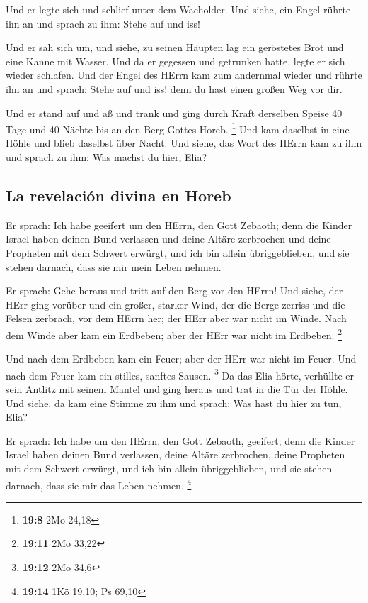  Und er legte sich und schlief unter dem Wacholder. Und
siehe, ein Engel rührte ihn an und sprach zu ihm: Stehe auf und iss!

 Und er sah sich um, und siehe, zu seinen Häupten lag ein
geröstetes Brot und eine Kanne mit Wasser. Und da er gegessen und
getrunken hatte, legte er sich wieder schlafen.  Und der
Engel des HErrn kam zum andernmal wieder und rührte ihn an und sprach:
Stehe auf und iss! denn du hast einen großen Weg vor dir.

 Und er stand auf und aß und trank und ging durch Kraft
derselben Speise 40 Tage und 40 Nächte bis an den Berg Gottes Horeb.
\footnote{\textbf{19:8} 2Mo 24,18}  Und kam daselbst in
eine Höhle und blieb daselbst über Nacht. Und siehe, das Wort des HErrn
kam zu ihm und sprach zu ihm: Was machst du hier, Elia?

\hypertarget{la-revelaciuxf3n-divina-en-horeb}{%
\subsection{La revelación divina en
Horeb}\label{la-revelaciuxf3n-divina-en-horeb}}

 Er sprach: Ich habe geeifert um den HErrn, den Gott
Zebaoth; denn die Kinder Israel haben deinen Bund verlassen und deine
Altäre zerbrochen und deine Propheten mit dem Schwert erwürgt, und ich
bin allein übriggeblieben, und sie stehen darnach, dass sie mir mein
Leben nehmen.

 Er sprach: Gehe heraus und tritt auf den Berg vor den
HErrn! Und siehe, der HErr ging vorüber und ein großer, starker Wind,
der die Berge zerriss und die Felsen zerbrach, vor dem HErrn her; der
HErr aber war nicht im Winde. Nach dem Winde aber kam ein Erdbeben; aber
der HErr war nicht im Erdbeben. \footnote{\textbf{19:11} 2Mo 33,22}

 Und nach dem Erdbeben kam ein Feuer; aber der HErr war
nicht im Feuer. Und nach dem Feuer kam ein stilles, sanftes Sausen.
\footnote{\textbf{19:12} 2Mo 34,6}  Da das Elia hörte,
verhüllte er sein Antlitz mit seinem Mantel und ging heraus und trat in
die Tür der Höhle. Und siehe, da kam eine Stimme zu ihm und sprach: Was
hast du hier zu tun, Elia?

 Er sprach: Ich habe um den HErrn, den Gott Zebaoth,
geeifert; denn die Kinder Israel haben deinen Bund verlassen, deine
Altäre zerbrochen, deine Propheten mit dem Schwert erwürgt, und ich bin
allein übriggeblieben, und sie stehen darnach, dass sie mir das Leben
nehmen. \footnote{\textbf{19:14} 1Kö 19,10; Ps 69,10}

